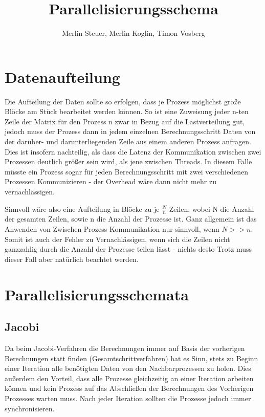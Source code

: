 \documentclass[11pt]{article} %
\title{Parallelisierungsschema}
\author{Merlin Steuer, Merlin Koglin, Timon Vosberg}
\date{} %
\begin{document}
\maketitle
\tableofcontents
\section{Datenaufteilung}

Die Aufteilung der Daten sollte so erfolgen, dass je Prozess möglichst große Blöcke am Stück bearbeitet werden können. So ist eine Zuweisung jeder n-ten Zeile der Matrix für den Prozess n zwar in Bezug auf die Lastverteilung gut, jedoch muss der Prozess dann in jedem einzelnen Berechnungsschritt Daten von der darüber- und darunterliegenden Zeile aus einem anderen Prozess anfragen. Dies ist insofern nachteilig, als dass die Latenz der Kommunikation zwischen zwei Prozessen deutlich größer sein wird, als jene zwischen Threads. In diesem Falle müsste ein Prozess sogar für jeden Berechnungsschritt mit zwei verschiedenen Prozessen Kommunizieren - der Overhead wäre dann nicht mehr zu vernachlässigen.

Sinnvoll wäre also eine Aufteilung in Blöcke zu je $\frac{N}{n}$ Zeilen, wobei N die Anzahl der gesamten Zeilen, sowie n die Anzahl der Prozesse ist. Ganz allgemein ist das Anwenden von Zwischen-Prozess-Kommunikation nur sinnvoll, wenn $N >> n$. Somit ist auch der Fehler zu Vernachlässigen, wenn sich die Zeilen nicht ganzzahlig durch die Anzahl der Prozesse teilen lässt - nichts desto Trotz muss dieser Fall aber natürlich beachtet werden.

\section{Parallelisierungsschemata}

\subsection{Jacobi}

Da beim Jacobi-Verfahren die Berechnungen immer auf Basis der vorherigen Berechnungen statt finden (Gesamtschrittverfahren) hat es Sinn, stets zu Beginn einer Iteration alle benötigten Daten von den Nachbarprozessen zu holen. Dies außerdem den Vorteil, dass alle Prozesse gleichzeitig an einer Iteration arbeiten können und kein Prozess auf das Abschließen der Berechnungen des Vorherigen Prozesses warten muss. Nach jeder Iteration sollten die Prozesse jedoch immer synchronisieren.
\end{document}
